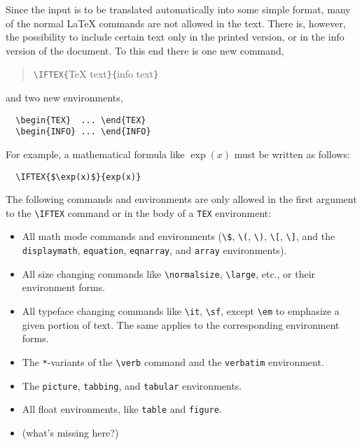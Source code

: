 Since the input is to be translated automatically into some simple
format, many of the normal \LaTeX{} commands are not allowed in the
text. There is, however, the possibility to include certain text only
in the printed version, or in the info version of the document. To
this end there is one new command,
\begin{quotation}
  \verb|\IFTEX{|\TeX{} text\verb|}{|info text\verb|}|
\end{quotation}
and two new environments,
\begin{verbatim}
  \begin{TEX}  ... \end{TEX}
  \begin{INFO} ... \end{INFO}
\end{verbatim}
For example, a mathematical formula like $\exp(x)$ must be written as
follows:
\begin{verbatim}
  \IFTEX{$\exp(x)$}{exp(x)}
\end{verbatim}
The following commands and environments are only allowed in the first
argument to the \verb|\IFTEX| command or in the body of a
\verb|TEX| environment:
\begin{itemize}
  \item All math mode commands and environments (\verb|\$|, \verb|\(|,
        \verb|\)|, \verb|\[|, \verb|\]|, and the \verb|displaymath|,
        \verb|equation|, \verb|eqnarray|, and \verb|array|
        environments).
  \item All size changing commands like \verb|\normalsize|,
        \verb|\large|, etc., or their environment forms.
  \item All typeface changing commands like \verb|\it|, \verb|\sf|,
        except \verb|\em| to emphasize a given portion of text. The
        same applies to the corresponding environment forms.
  \item The \verb|*|-variants of the \verb|\verb| command and the 
        \verb|verbatim| environment.
  \item The \verb|picture|, \verb|tabbing|, and \verb|tabular|
        environments.
  \item All float environments, like \verb|table| and \verb|figure|.
  \item (what's missing here?)
\end{itemize}

